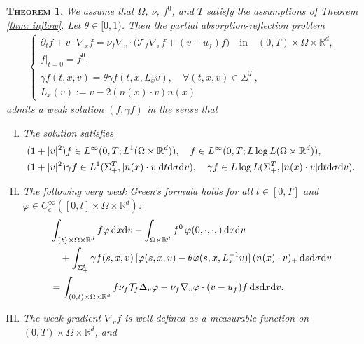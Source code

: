 \documentclass[10pt, reqno]{amsart}
\theoremstyle{plain}
\newtheorem{theorem}{\normalfont \scshape Theorem}[section]
\theoremstyle{definition}
\theoremstyle{remark}
\numberwithin{equation}{section}
\newcommand{\calT}{\mathcal T}
\newcommand{\p}{\partial}
\newcommand{\R}{\mathbb{R}}
\newcommand{\dx}{\textnormal{d}x}
\newcommand{\dv}{\textnormal{d}v}
\newcommand{\dt}{\textnormal{d}t}
\newcommand{\ds}{\textnormal{d}s}
\newcommand{\tnd}{\textnormal{d}}
\begin{document}
\begin{theorem}\label{thm: reflection}
    We assume that $\Omega$, $\nu$, $f^0$, and $T$ satisfy the assumptions of Theorem \ref{thm: inflow}. Let $\theta \in [0,1)$. Then the partial absorption-reflection problem
    \begin{align*}
        \begin{cases}
            \p_t f + v\cdot \nabla_x f = \nu_f \nabla_v\cdot \Big( \calT_f \nabla_v f + (v- u _f) f \Big) \quad \text{in} \quad (0,T)\times \Omega\times\R^d, \\
            f|_{t=0} = f^0, \\
        \gamma f(t,x,v) = \theta \gamma f (t,x,L_x v), \quad \forall (t,x,v) \in \Sigma_-^T, \\
        L_x (v) := v - 2(n(x)\cdot v) n(x)
        \end{cases}
    \end{align*}
    admits a weak solution $(f,\gamma f)$ in the sense that
    \begin{enumerate}[(I)]
        \item The solution satisfies
        \begin{equation*}
    \begin{split}
        &(1+|v|^2)f \in L^\infty(0,T;L^1(\Omega\times\R^d)), \quad f \in L^\infty(0,T;L\log L(\Omega\times\R^d)), \\
        &(1+|v|^2)\gamma f \in L^1(\Sigma^T_+, |n(x)\cdot v|\dt\tnd\sigma\dv), \quad \gamma f \in L\log L(\Sigma_+^T, |n(x)\cdot v|\dt\tnd\sigma\dv).
    \end{split}
    \end{equation*}
        \item The following very weak Green's formula holds for all $t\in [0,T]$ and $\varphi\in C_c^\infty([0,t]\times\overline{\Omega}\times\R^d)$:
        \begin{align*}
            &\int_{\{t\}\times \Omega\times\R^d} f\varphi\,\dx\dv - \int_{\Omega\times\R^d} f^0 \,\varphi(0,\cdot,\cdot,)\,\dx\dv\\
            &\quad + \int_{\Sigma_+^t} \gamma f(s,x,v)\,[\varphi(s,x,v) - \theta \varphi(s,x,L_x^{-1}v)] \,(n(x)\cdot v)_+ \,\ds\tnd\sigma\dv  \\
            &= \int_{(0,t)\times\Omega\times\R^d} f\nu_f \calT_f \Delta_v \varphi - \nu_f \nabla_v\varphi \cdot (v-u_f)f \,\ds\dx\dv.
        \end{align*}
        \item The weak gradient $\nabla_v f$ is well-defined as a measurable function on $(0,T)\times\Omega\times\R^d$, and

\end{enumerate}
\end{theorem}
\end{document}
